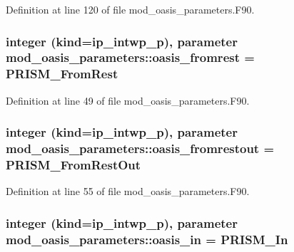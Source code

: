 Definition at line 120 of file mod\+\_\+oasis\+\_\+parameters.\+F90.

\hypertarget{classmod__oasis__parameters_aa0584909970d34364b7ec319292b1682}{
\subsubsection[{oasis\+\_\+fromrest}]{\setlength{\rightskip}{0pt plus 5cm}integer (kind=ip\+\_\+intwp\+\_\+p), parameter mod\+\_\+oasis\+\_\+parameters\+::oasis\+\_\+fromrest = P\+R\+I\+S\+M\+\_\+\+From\+Rest}}\label{classmod__oasis__parameters_aa0584909970d34364b7ec319292b1682}


Definition at line 49 of file mod\+\_\+oasis\+\_\+parameters.\+F90.

\hypertarget{classmod__oasis__parameters_a76a87a170e0c08863ae981693eb88fb8}{
\subsubsection[{oasis\+\_\+fromrestout}]{\setlength{\rightskip}{0pt plus 5cm}integer (kind=ip\+\_\+intwp\+\_\+p), parameter mod\+\_\+oasis\+\_\+parameters\+::oasis\+\_\+fromrestout = P\+R\+I\+S\+M\+\_\+\+From\+Rest\+Out}}\label{classmod__oasis__parameters_a76a87a170e0c08863ae981693eb88fb8}


Definition at line 55 of file mod\+\_\+oasis\+\_\+parameters.\+F90.

\hypertarget{classmod__oasis__parameters_a16809ad581bb609aa5b0661927478653}{
\subsubsection[{oasis\+\_\+in}]{\setlength{\rightskip}{0pt plus 5cm}integer (kind=ip\+\_\+intwp\+\_\+p), parameter mod\+\_\+oasis\+\_\+parameters\+::oasis\+\_\+in = P\+R\+I\+S\+M\+\_\+\+In}}\label{classmod__oasis__parameters_a16809ad581bb609aa5b0661927478653}


